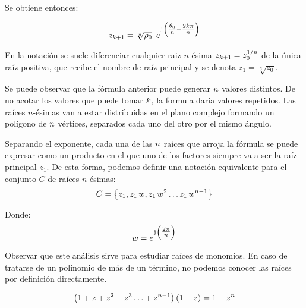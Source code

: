 Se obtiene entonces:

\begin{mdframed}[style=PropertyFrame]
    \begin{prop}
    \end{prop}
    \begin{equation*}
        z_{k+1} = \sqrt[n]{\rho_0} \enspace e^{\mkern2mu\mathrm{j}\mkern1mu \left( \tfrac{\theta_0}{n} + \tfrac{2 k \pi}{n} \right)}
    \end{equation*}
\end{mdframed}

En la notación se suele diferenciar cualquier raiz $n$-ésima $z_{k+1} = z_0^{1/n}$ de la única raíz positiva, que recibe el nombre de raíz principal y se denota $z_1=\sqrt[n]{z_0}$.

Se puede observar que la fórmula anterior puede generar $n$ valores distintos.
De no acotar los valores que puede tomar $k$, la formula daría valores repetidos.
Las raíces $n$-ésimas van a estar distribuidas en el plano complejo formando un polígono de $n$ vértices, separados cada uno del otro por el mismo ángulo.

Separando el exponente, cada una de las $n$ raíces que arroja la fórmula se puede expresar como un producto en el que uno de los factores siempre va a ser la raíz principal $z_1$.
De esta forma, podemos definir una notación equivalente para el conjunto $C$ de raíces $n$-ésimas:
\begin{equation*}
    C = { \left\{ {z_1 , z_1 \, w , z_1 \, w^2 \ldots z_1 \, w^{n-1}} \right\} }
\end{equation*}

Donde:
\begin{equation*}
    w = e^{\mkern2mu\mathrm{j}\mkern1mu \left( \tfrac{2 \pi}{n} \right)}
\end{equation*}

Observar que este análisis sirve para estudiar raíces de monomios.
En caso de tratarse de un polinomio de más de un término, no podemos conocer las raíces por definición directamente.

\begin{mdframed}[style=PropertyFrame]
    \begin{prop}
    \end{prop}
    \begin{equation*}
        \left( 1 + z + z^2 + z^3 \ldots + z^{n-1} \right) \left( 1 - z \right) = 1 - z^n
    \end{equation*}
\end{mdframed}


